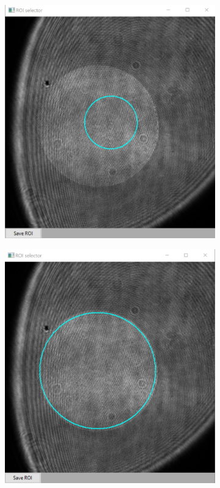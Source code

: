 \begin{figure}[h]
	\centering
	\begin{subfigure}{0.4\textwidth}
		\centering
		\includegraphics[width=1\linewidth]{images/ROI_selector_init.jpg}
		\caption{}
		\label{fig:ROI_selector_init}
	\end{subfigure}
	\begin{subfigure}{0.4\textwidth}
		\centering
		\includegraphics[width=1\linewidth]{images/ROI_selector.jpg}

\end{subfigure}
\end{figure}
